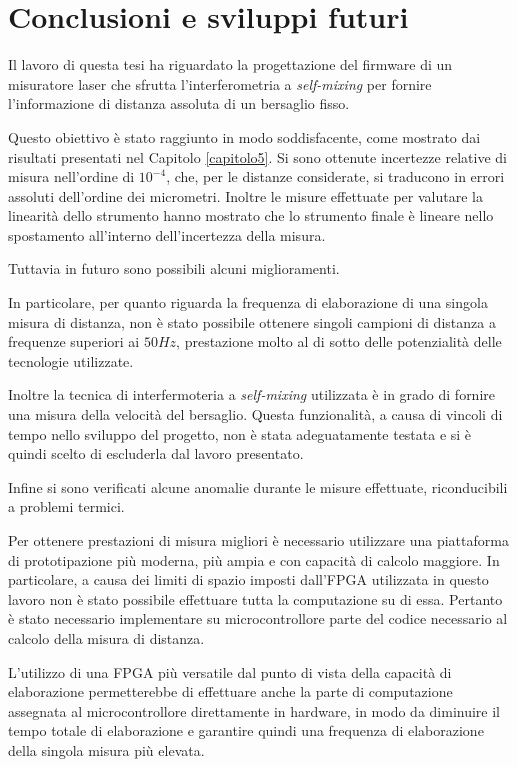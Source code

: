 \chapter*{Conclusioni e sviluppi futuri}
\label{conclusioni}
\thispagestyle{empty}

Il lavoro di questa tesi ha riguardato la progettazione del firmware di un misuratore laser che sfrutta l'interferometria a \textit{self-mixing} per fornire l'informazione di distanza assoluta di un bersaglio fisso.

Questo obiettivo è stato raggiunto in modo soddisfacente, come mostrato dai risultati presentati nel Capitolo \ref{capitolo5}. Si sono ottenute incertezze relative di misura nell'ordine di $10^{-4}$, che, per le distanze considerate, si traducono in errori assoluti dell'ordine dei micrometri. Inoltre le misure effettuate per valutare la linearità dello strumento hanno mostrato che lo strumento finale è lineare nello spostamento all'interno dell'incertezza della misura.

Tuttavia in futuro sono possibili alcuni miglioramenti.

In particolare, per quanto riguarda la frequenza di elaborazione di una singola misura di distanza, non è stato possibile ottenere singoli campioni di distanza a frequenze superiori ai $50Hz$, prestazione molto al di sotto delle potenzialità delle tecnologie utilizzate. 

Inoltre la tecnica di interfermoteria a \textit{self-mixing} utilizzata è in grado di fornire una misura della velocità del bersaglio. Questa funzionalità, a causa di vincoli di tempo nello sviluppo del progetto, non è stata adeguatamente testata e si è quindi scelto di escluderla dal lavoro presentato. 

Infine si sono verificati alcune anomalie durante le misure effettuate, riconducibili a problemi termici.

Per ottenere prestazioni di misura migliori è necessario utilizzare una piattaforma di prototipazione più moderna, più ampia e con capacità di calcolo maggiore. In particolare, a causa dei limiti di spazio imposti dall'FPGA utilizzata in questo lavoro non è stato possibile effettuare tutta la computazione su di essa. Pertanto è stato necessario implementare su microcontrollore parte del codice necessario al calcolo della misura di distanza.

L'utilizzo di una FPGA più versatile dal punto di vista della capacità di elaborazione permetterebbe di effettuare anche la parte di computazione assegnata al microcontrollore direttamente in hardware, in modo da diminuire il tempo totale di elaborazione e garantire quindi una frequenza di elaborazione della singola misura più elevata.

